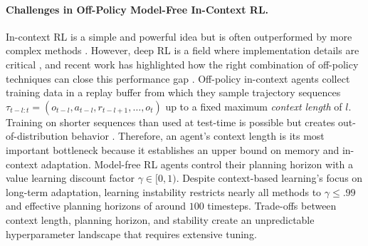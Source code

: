 \documentclass{article}
\begin{document}
\paragraph{Challenges in Off-Policy Model-Free In-Context RL.} In-context RL is a simple and powerful idea but is often outperformed by more complex methods \cite{zintgraf2021varibad, rakelly2019efficient, beck2023survey}. However, deep RL is a field where implementation details are critical \cite{henderson2018deep}, and recent work has highlighted how the right combination of off-policy techniques can close this performance gap \cite{ni2022recurrent}. Off-policy in-context agents collect training data in a replay buffer from which they sample trajectory sequences $\tau_{t-l:t} = (o_{t-l}, a_{t-l}, r_{t-l+1}, \dots, o_t)$ up to a fixed maximum \textit{context length} of $l$. Training on shorter sequences than used at test-time is possible but creates out-of-distribution behavior \cite{kapturowski2018recurrent, hausknecht2015deep, heess2015memory}. Therefore, an agent's context length is its most important bottleneck because it establishes an upper bound on memory and in-context adaptation. Model-free RL agents control their planning horizon with a value learning discount factor $\gamma \in [0, 1)$. Despite context-based learning's focus on long-term adaptation, learning instability restricts nearly all methods to $\gamma \leq .99$ and effective planning horizons of around $100$ timesteps. Trade-offs between context length, planning horizon, and stability create an unpredictable hyperparameter landscape \cite{ni2022recurrent} that requires extensive tuning.
\end{document}
